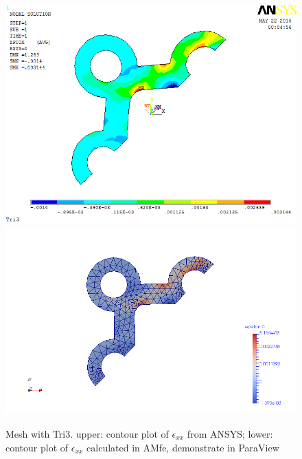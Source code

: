 \begin{figure}[htbp]
	\begin{center}
		\includegraphics[width=13cm,clip]{TTri3_Exx.png} 		
		\includegraphics[width=13cm,clip]{TTri3_Exx_P.png} 		
		\caption{Mesh with Tri3. upper: contour plot of $\epsilon_{xx}$ from ANSYS; lower: contour plot of $\epsilon_{xx}$ calculated in AMfe, demonstrate in ParaView} \label{fig: Tri3_Exx}
	\end{center}
\end{figure}
\clearpage 

